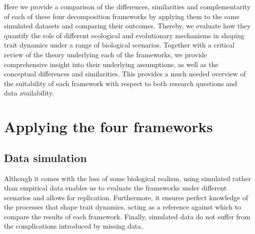 Here we provide a comparison of the differences, similarities and complementarity of each of these four decomposition frameworks by applying them to the same simulated datasets and comparing their outcomes. Thereby, we evaluate how they quantify the role of different ecological and evolutionary mechanisms in shaping trait dynamics under a range of biological scenarios. Together with a critical review of the theory underlying each of the frameworks, we provide comprehensive insight into their underlying assumptions, as well as the conceptual differences and similarities. This provides a much needed overview of the suitability of each framework with respect to both research questions and data availability.



\section{Applying the four frameworks}


\subsection{Data simulation}

Although it comes with the loss of some biological realism, using simulated rather than empirical data enables us to evaluate the frameworks under different scenarios and allows for replication. Furthermore, it ensures perfect knowledge of the processes that shape trait dynamics, acting as a reference against which to compare the results of each framework. Finally, simulated data do not suffer from the complications introduced by missing data. 

